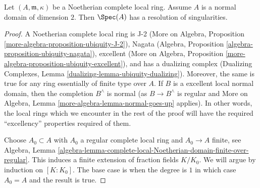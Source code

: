 %
\begin{lemma}
\label{lemma-resolve-complete}
Let $(A, \mathfrak m, \kappa)$ be a Noetherian complete local ring.
Assume $A$ is a normal domain of dimension $2$. Then $\Spec(A)$ has a
resolution of singularities.
\end{lemma}

\begin{proof}
A Noetherian complete local ring is J-2
(More on Algebra, Proposition \ref{more-algebra-proposition-ubiquity-J-2}),
Nagata (Algebra, Proposition \ref{algebra-proposition-ubiquity-nagata}),
excellent (More on Algebra, Proposition
\ref{more-algebra-proposition-ubiquity-excellent}),
and has a dualizing complex
(Dualizing Complexes, Lemma \ref{dualizing-lemma-ubiquity-dualizing}).
Moreover, the same is true for any ring essentially of finite type over $A$.
If $B$ is a excellent local normal domain, then the completion
$B^\wedge$ is normal (as $B \to B^\wedge$ is regular and
More on Algebra, Lemma \ref{more-algebra-lemma-normal-goes-up} applies).
In other words, the local rings which we encounter in the rest of the proof
will have the required ``excellency'' properties required of them.

\medskip\noindent
Choose $A_0 \subset A$ with $A_0$ a regular complete local ring
and $A_0 \to A$ finite, see Algebra, Lemma
\ref{algebra-lemma-complete-local-Noetherian-domain-finite-over-regular}.
This induces a finite extension of fraction fields $K/K_0$.
We will argue by induction on $[K : K_0]$. The base case is
when the degree is $1$ in which case $A_0 = A$ and the result is true.


\end{proof}
